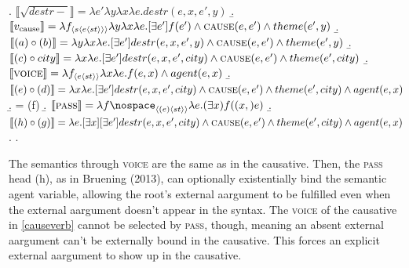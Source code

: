 \documentclass[12pt]{article}
\newcommand*{\textsub}[1]{\ensuremath{_\textrm{{\scriptsize #1}}}}
\begin{document}
\a. \begin{math}\llbracket\sqrt{destr-}\rrbracket = \lambda e' \lambda y \lambda x \lambda e . destr(e,x,e',y)\end{math}
\b. \begin{math}\llbracket v\textsub{cause}\rrbracket = \lambda f_{\langle s\langle e \langle st \rangle \rangle \rangle} \lambda y \lambda x \lambda e . [\exists e']f(e') \land \textsc{cause}(e,e') \land theme(e',y)\end{math}
\b. \begin{math}\llbracket (a) \circ (b) \rrbracket = \lambda y \lambda x \lambda e . [\exists e'] destr(e,x,e',y) \land \textsc{cause}(e,e') \land theme(e',y) \end{math}
\b. \begin{math}\llbracket (c) \circ city\rrbracket = \lambda x \lambda e . [\exists e'] destr(e,x,e',city) \land \textsc{cause}(e,e') \land theme(e',city) \end{math}
\b. \begin{math}\llbracket \textsc{voice}\rrbracket = \lambda f_{\langle e \langle st \rangle \rangle } \lambda x \lambda e . f(e,x) \land agent(e,x) \end{math}
\b. \begin{math}\llbracket (e) \circ (d) \rrbracket = \lambda x \lambda e . [\exists e'] destr(e,x,e',city) \land \textsc{cause}(e,e') \land theme(e',city) \land agent(e,x) \end{math}
\b. = (f)
\b. \begin{math}\llbracket \textsc{pass}\rrbracket = \lambda f\nospace_{\langle (e) \langle st \rangle\rangle}\lambda e . (\exists x) f((x,)e) \end{math}
\b. \begin{math}\llbracket (h) \circ (g) \rrbracket =\lambda e . [\exists x][\exists e'] destr(e,x,e',city) \land \textsc{cause}(e,e') \land theme(e',city) \land agent(e,x) \end{math}
\z. \z. \par

\doublespacing

The semantics through \textsc{voice} are the same as in the causative. Then, the \textsc{pass} head (h), as in Bruening (2013), can optionally existentially bind the semantic agent variable, allowing the root's external aargument to be fulfilled even when the external aargument doesn't appear in the syntax. The \textsc{voice} of the causative in \ref{causeverb} cannot be selected by \textsc{pass}, though, meaning an absent external aargument can't be externally bound in the causative. This forces an explicit external aargument to show up in the causative.
\end{document}
